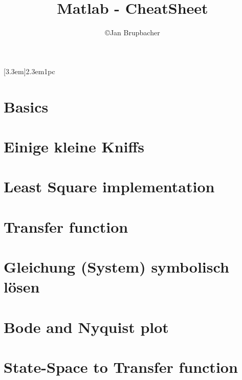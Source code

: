 % 
%

\newcommand{\Author}{\copyright Jan Brupbacher}
\newcommand{\Title}{Matlab - CheatSheet}

\author{\Author}
\title{\Title}


	

\usepackage{bold-extra}

[3.3em]{\bfseries}{2.3em}{1pc}


	\maketitle
	\thispagestyle{empty}
	\vspace{1em}
	\begin{adjustwidth}{4em}{4em}
		\tableofcontents
	\end{adjustwidth}
	\newpage
	
	\lstset{
		style=Matlab,
		numbers=left,
		xleftmargin=15pt,
	}
	\section{Basics}
	
	\section{Einige kleine Kniffs}
	
	\section{Least Square implementation}
	
	\section{Transfer function}
	
	\section{Gleichung (System) symbolisch l\"osen}
	
	\section{Bode and Nyquist plot}
	
	\section{State-Space to Transfer function}
	
